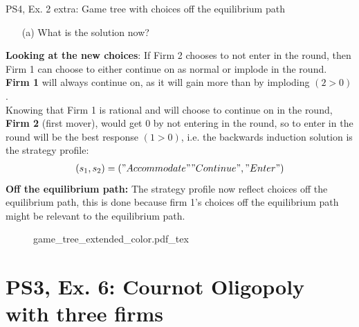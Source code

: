 \begin{frame}{PS4, Ex. 2 extra: Game tree with choices off the equilibrium path}
  \begin{multicols}{2}
    \begin{itemize}
      \item[(a)] What is the solution now?
    \end{itemize}
    \textbf{Looking at the new choices}: If Firm 2 chooses to not enter in the  round, then Firm 1 can choose to either continue on as normal or implode in the  round.\\\medskip
    \textbf{Firm 1} will always continue on, as it will gain more than by imploding $(2>0)$.\\\medskip
    Knowing that Firm 1 is rational and will choose to continue on in the  round, \textbf{Firm 2} (first mover), would get 0 by not entering in the  round, so to enter in the  round will be the best response $(1>0)$, i.e. the backwards induction solution is the strategy profile:
      \begin{align*}
        (s_1,s_2)=("Accommodate""Continue","Enter")
      \end{align*}
    \textbf{Off the equilibrium path:} The strategy profile now reflect choices off the equilibrium path, this is done because firm 1's choices off the equilibrium path might be relevant to the equilibrium path.
  \vfill\null \columnbreak
    \begin{figure}[!h]
      \begin{center}
      \def\svgwidth{1.0\columnwidth}
      {game_tree_extended_color.pdf_tex}
      \end{center}
    \end{figure}
  \vfill\null
  \end{multicols}
\end{frame}


\section{PS3, Ex. 6: Cournot Oligopoly with three firms}

